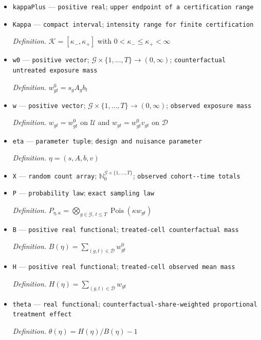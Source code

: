 \documentclass{article}
\begin{document}
\begin{itemize}
  \item \texttt{kappaPlus} --- \texttt{positive real}; \texttt{upper endpoint of a certification range}
  \item \texttt{Kappa} --- \texttt{compact interval}; \texttt{intensity range for finite certification}
  \par\smallskip\noindent\emph{Definition.} \(\mathcal K=[\kappa_-,\kappa_+]\) with \(0<\kappa_-\le\kappa_+<\infty\)
  \item \texttt{w0} --- \texttt{positive vector}; \(\mathcal G\times\{1,\ldots,T\}\to(0,\infty)\); \texttt{counterfactual untreated exposure mass}
  \par\smallskip\noindent\emph{Definition.} \(w^0_{gt}=s_gA_gb_t\)
  \item \texttt{w} --- \texttt{positive vector}; \(\mathcal G\times\{1,\ldots,T\}\to(0,\infty)\); \texttt{observed exposure mass}
  \par\smallskip\noindent\emph{Definition.} \(w_{gt}=w^0_{gt}\) on \(\mathcal U\) and \(w_{gt}=w^0_{gt}v_{gt}\) on \(\mathcal D\)
  \item \texttt{eta} --- \texttt{parameter tuple}; \texttt{design and nuisance parameter}
  \par\smallskip\noindent\emph{Definition.} \(\eta=(s,A,b,v)\)
  \item \texttt{X} --- \texttt{random count array}; \(\mathbb N_0^{\mathcal G\times\{1,\ldots,T\}}\); \texttt{observed cohort-\allowbreak{}-\allowbreak{}time totals}
  \item \texttt{P} --- \texttt{probability law}; \texttt{exact sampling law}
  \par\smallskip\noindent\emph{Definition.} \(P_{\eta,\kappa}=\bigotimes_{g\in\mathcal G,\,t\le T}\operatorname{Pois}(\kappa w_{gt})\)
  \item \texttt{B} --- \texttt{positive real functional}; \texttt{treated-\allowbreak{}cell counterfactual mass}
  \par\smallskip\noindent\emph{Definition.} \(B(\eta)=\sum_{(g,t)\in\mathcal D}w^0_{gt}\)
  \item \texttt{H} --- \texttt{positive real functional}; \texttt{treated-\allowbreak{}cell observed mean mass}
  \par\smallskip\noindent\emph{Definition.} \(H(\eta)=\sum_{(g,t)\in\mathcal D}w_{gt}\)
  \item \texttt{theta} --- \texttt{real functional}; \texttt{counterfactual-\allowbreak{}share-\allowbreak{}weighted proportional treatment effect}
  \par\smallskip\noindent\emph{Definition.} \(\theta(\eta)=H(\eta)/B(\eta)-1\)

\end{itemize}
\end{document}

